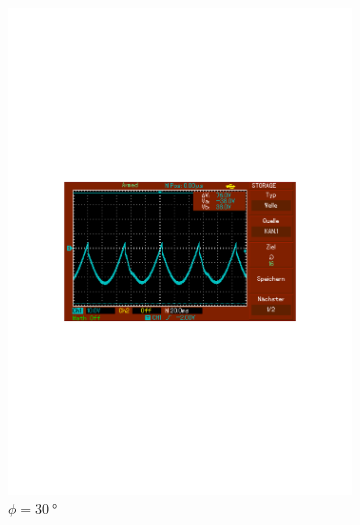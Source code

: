 \begin{figure}
  \begin{subfigure}{0.3\textwidth}
      \centering
      \includegraphics[width=\textwidth]{Daten/noNoise/30.pdf}
      \caption{$\phi = \SI{30}{\degree}$}
      \label{fig:1_45}
  \end{subfigure}
  \begin{subfigure}{0.3\textwidth}
      \centering

\end{subfigure}
\end{figure}
